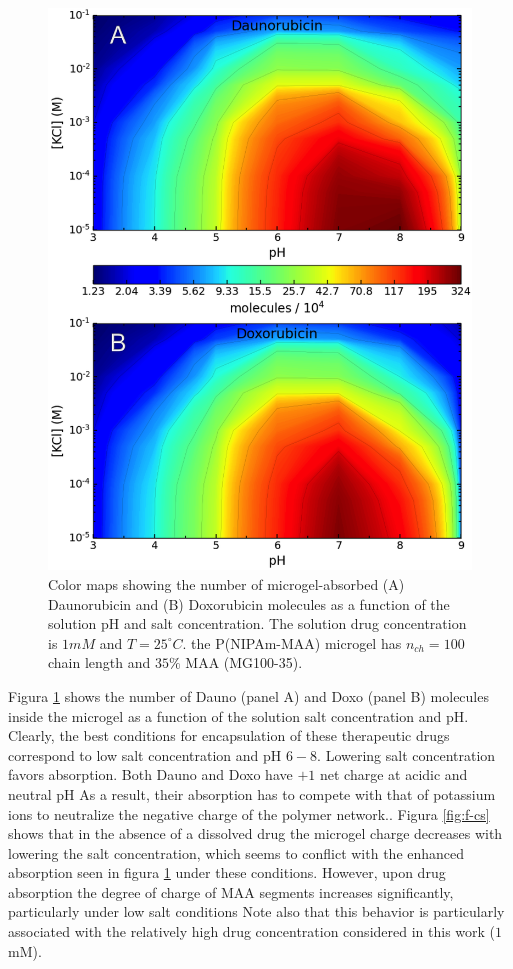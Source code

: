 \begin{figure}[!tb]
	\centering
	\includegraphics[width=0.55\linewidth]{Figures/graph-gel/drug_ads.png}
	\caption{Color maps showing the number of microgel-absorbed (A) Daunorubicin and (B) Doxorubicin molecules as a function of the solution pH and salt concentration.
		The solution drug concentration is $1mM$ and $T=25 ^\circ C$.
		the P(NIPAm-MAA) microgel has $n_{ch}=100$ chain length and $35\%$ MAA (MG100-35).}
	\label{fig:drug_ads}
\end{figure}




Figura \ref{fig:drug_ads} shows the number of Dauno (panel A) and Doxo (panel B) molecules inside the microgel as a function of the solution salt concentration and pH.
Clearly, the best conditions for encapsulation of these therapeutic drugs correspond to low salt concentration and pH $6-8$.
Lowering salt concentration favors absorption.
Both Dauno and Doxo have $+1$ net charge at acidic and neutral pH %
As a result, their absorption has to compete with that of potassium ions to neutralize the negative charge of the polymer network.\addcite[PerezChavez2020].
Figura \ref{fig:f-cs} shows that in the absence of a dissolved drug the microgel charge decreases with lowering the salt concentration, which seems to conflict with the enhanced absorption seen in figura \ref{fig:drug_ads} under these conditions.
However, upon drug absorption the degree of charge of MAA segments increases significantly, particularly under low salt conditions %
Note also that this behavior is particularly associated with the relatively high drug concentration considered in this work ($1\,$mM).

